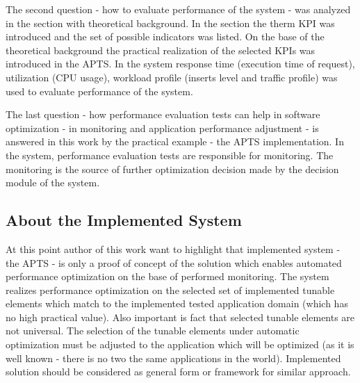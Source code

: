 \documentclass[12pt,a4paper]{article}
\begin{document}
The second question - how to evaluate performance of the system - was analyzed in the section with theoretical background. In the section the therm KPI was introduced and the set of possible indicators was listed. On the base of the theoretical background the practical realization of the selected KPIs was introduced in the APTS. In the system response time (execution time of request), utilization (CPU usage), workload profile (inserts level and traffic profile) was used to evaluate performance of the system.

The last question - how performance evaluation tests can help in software optimization - in monitoring and application performance adjustment - is answered in this work by the practical example - the APTS implementation. In the system, performance evaluation tests are responsible for monitoring. The monitoring is the source of further optimization decision made by the decision module of the system.  


\subsection{About the Implemented System}

At this point author of this work want to highlight that implemented system - the APTS - is only a proof of concept of the solution which enables automated performance optimization on the base of performed monitoring. The system realizes performance optimization on the selected set of implemented tunable elements which match to the implemented tested application domain (which has no high practical value). Also important is fact that selected tunable elements are not universal. The selection of the tunable elements under automatic optimization must be adjusted to the application which will be optimized (as it is well known - there is no two the same applications in the world). Implemented solution should be considered as general form or framework for similar approach. 
\end{document}
